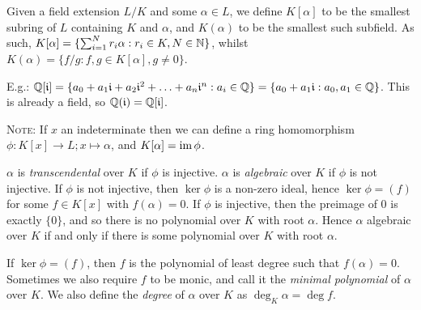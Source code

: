 \documentclass[10pt,a4paper]{article}
\begin{document}
Given a field extension $L/K$ and some $\alpha \in L$, we define $K[\alpha]$ to be the smallest subring of $L$ containing $K$ and $\alpha$, and $K(\alpha)$ to be the smallest such subfield. As such, $K[\alpha] = \{\sum_{i=1}^N r_i \alpha : r_i \in K, N \in \mathbb{N}\}$, whilst $K(\alpha) = \{f/g : f,g \in K[\alpha], g\neq 0\}$.

E.g.: $\mathbb{Q}[\mathfrak{i}] = \{a_0 + a_1\mathfrak{i} + a_2\mathfrak{i}^2 + \ldots + a_n\mathfrak{i}^n :a_i\in\mathbb{Q}\} = \{a_0 + a_1\mathfrak{i} : a_0, a_1 \in \mathbb{Q}\}$. This is already a field, so $\mathbb{Q}(\mathfrak{i}) = \mathbb{Q}[\mathfrak{i}]$.

\textsc{Note:} If $x$ an indeterminate then we can define a ring homomorphism $\phi:K[x] \rightarrow L; x\mapsto \alpha$, and $K[\alpha] = \operatorname{im} \phi$.

$\alpha$ is \emph{transcendental} over $K$ if $\phi$ is injective. $\alpha$ is \emph{algebraic} over $K$ if $\phi$ is not injective. If $\phi$ is not injective, then $\ker\phi$ is a non-zero ideal, hence $\ker\phi = (f)$ for some $f\in K[x]$ with $f(\alpha) = 0$. If $\phi$ is injective, then the preimage of $0$ is exactly $\{0\}$, and so there is no polynomial over $K$ with root $\alpha$. Hence $\alpha$ algebraic over $K$ if and only if there is some polynomial over $K$ with root $\alpha$.

If $\ker \phi = (f)$, then $f$ is the polynomial of least degree such that $f(\alpha) = 0$. Sometimes we also require $f$ to be monic, and call it the \emph{minimal polynomial} of $\alpha$ over $K$. We also define the \emph{degree} of $\alpha$ over $K$ as $\deg_K \alpha = \deg f$.
\end{document}
